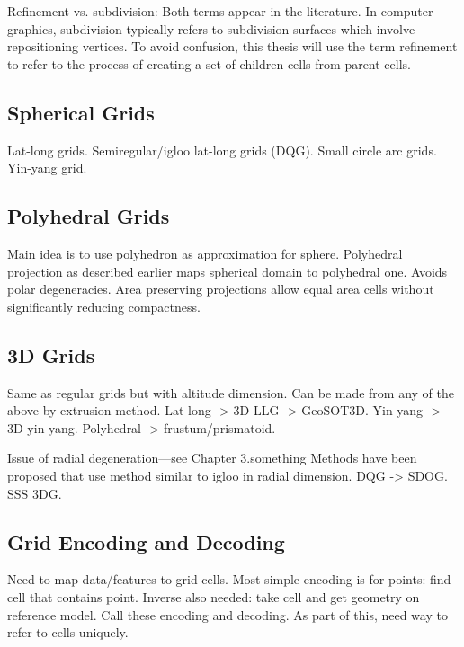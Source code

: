 Refinement vs. subdivision: Both terms appear in the literature.
In computer graphics, subdivision typically refers to subdivision surfaces which involve repositioning vertices.
To avoid confusion, this thesis will use the term refinement to refer to the process of creating a set of children cells from parent cells.


\subsection{Spherical Grids}
Lat-long grids.
Semiregular/igloo lat-long grids (DQG).
Small circle arc grids.
Yin-yang grid.
\cite{leopardi2006partition}
\cite{sun2008global}
\cite{song2002developing}
\cite{kageyama2004yin-yang}


\subsection{Polyhedral Grids}
Main idea is to use polyhedron as approximation for sphere.
Polyhedral projection as described earlier maps spherical domain to polyhedral one.
Avoids polar degeneracies.
Area preserving projections allow equal area cells without significantly reducing compactness.
\cite{fekete1990sphere}
\cite{dutton1996encoding}
\cite{gorski2005healpix}
\cite{holhocs2014octahedral}
\cite{mahdavi2013one} %
\cite{mahdavi2015hexagonal} %


\subsection{3D Grids}
Same as regular grids but with altitude dimension.
Can be made from any of the above by extrusion method.
Lat-long -> 3D LLG -> GeoSOT3D.
Yin-yang -> 3D yin-yang.
Polyhedral -> frustum/prismatoid.
\cite{yoo2019concept}
\cite{sun20153d}
\cite{yoshida2004application}
\cite{kageyama2005geodynamo}
\cite{tackley2008modelling}


Issue of radial degeneration---see Chapter 3.something
Methods have been proposed that use method similar to igloo in radial dimension.
DQG -> SDOG.
SSS 3DG.
\cite{yu2009sdog}
\cite{yu2012large-scale}
\cite{yu2012lithosphere}
\cite{gang2013sphere} 
\cite{wang2013global}


\subsection{Grid Encoding and Decoding}
Need to map data/features to grid cells.
Most simple encoding is for points: find cell that contains point.
Inverse also needed: take cell and get geometry on reference model.
Call these encoding and decoding.
As part of this, need way to refer to cells uniquely.
\cite{du2018duality}


